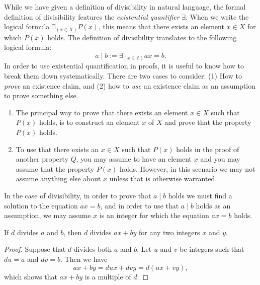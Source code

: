 \begin{remark}
  While we have given a definition of divisibility in natural language, the formal definition of divisibility features the \emph{existential quantifier} $\exists$. When we write the logical formula $\exists_{(x\in X)}P(x)$, this means that there exists an element $x\in X$ for which $P(x)$ holds. The definition of divisibility translates to the following logical formula:
  \begin{equation*}
    a\mid b := \exists_{(x\in\mathbb{Z})}ax=b.
  \end{equation*}
  In order to use existential quantification in proofs, it is useful to know how to break them down systematically. There are two cases to consider: (1) How to \emph{prove} an existence claim, and (2) how to \emph{use} an existence claim as an assumption to prove something else.
  \begin{enumerate}
  \item The principal way to prove that there exists an element $x\in X$ such that $P(x)$ holds, is to construct an element $x$ of $X$ and prove that the property $P(x)$ holds.
  \item To use that there exists an $x\in X$ such that $P(x)$ holds in the proof of another property $Q$, you may assume to have an element $x$ and you may assume that the property $P(x)$ holds. However, in this scenario we may not assume anything else about $x$ unless that is otherwise warranted.
  \end{enumerate}
  In the case of divisibility, in order to prove that $a\mid b$ holds we must find a solution to the equation $ax=b$, and in order to use that $a\mid b$ holds as an assumption, we may assume $x$ is an integer for which the equation $ax=b$ holds.
\end{remark}

\begin{proposition}
  If $d$ divides $a$ and $b$, then $d$ divides $ax+by$ for any two integers $x$ and $y$.
\end{proposition}

\begin{proof}
  Suppose that $d$ divides both $a$ and $b$. Let $u$ and $v$ be integers such that $du=a$ and $dv=b$. Then we have
  \begin{equation*}
    ax+by = dux + dvy = d(ux + vy),
  \end{equation*}
  which shows that $ax + by$ is a multiple of $d$.
\end{proof}

